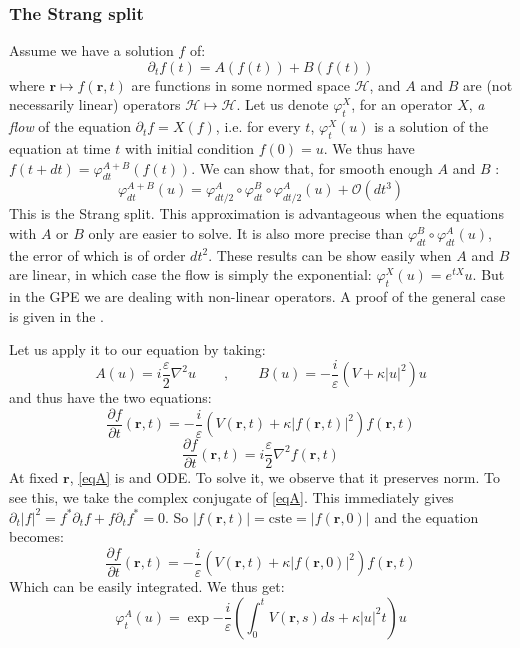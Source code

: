 \documentclass{article}
\begin{document}
\subsubsection*{The Strang split}
Assume we have a solution $f$ of:
$$
\partial_t f(t)= A(f(t))+B(f(t))
$$
where $\mathbf{r}\longmapsto f(\mathbf{r},t)$ are functions in some normed space $\mathcal{H}$, and $A$ and $B$ are (not necessarily linear) operators $\mathcal{H} \longmapsto \mathcal{H}$. Let us denote $\varphi^X_t$, for an operator $X$, \textit{a flow} of the equation $\partial_t f= X(f)$, i.e. for every $t$, $\varphi^X_t(u)$ is a solution of the equation at time $t$ with initial condition $f(0)=u$. We thus have $f(t+dt)=\varphi^{A+B}_{dt}(f(t))$. We can show that, for smooth enough $A$ and $B$ :
\begin{equation}\label{strangsplit}
    \varphi^{A+B}_{dt}(u)=\varphi^A_{dt/2}\circ\varphi^B_{dt}\circ\varphi^A_{dt/2}(u)+\mathcal{O}(dt^3)
\end{equation}
This is the Strang split. This approximation is advantageous when the equations with $A$ or $B$ only are easier to solve. It is also more precise than $\varphi^B_{dt}\circ\varphi^A_{dt}(u)$, the error of which is of order $dt^2$. These results can be show easily when $A$ and $B$ are linear, in which case the flow is simply the exponential: $\varphi^X_t(u)=e^{tX}u$. But in the GPE we are dealing with non-linear operators. A proof of the general case is given in the .

\bigskip
Let us apply it to our equation by taking:
$$A(u)=i\frac{\varepsilon}{2} \nabla^{2} u \qquad,\qquad B(u)=-\frac{i}{\varepsilon}\left(V +\kappa|u|^{2}\right) u$$
and thus have the two equations:
\begin{equation}\label{eqA}
    \frac{\partial f}{\partial t}(\mathbf{r},t)=-\frac{i}{\varepsilon}\left(V(\mathbf{r},t) +\kappa|f(\mathbf{r},t)|^{2}\right) f(\mathbf{r},t)
\end{equation}
\begin{equation}\label{eqB}
    \frac{\partial f}{\partial t}(\mathbf{r},t)=i\frac{\varepsilon}{2} \nabla^{2} f(\mathbf{r},t)
\end{equation}
At fixed $\mathbf{r}$, \eqref{eqA} is and ODE. To solve it, we observe that it preserves norm. To see this, we take the complex conjugate of \eqref{eqA}. This immediately gives $\partial_t|f|^2=f^*\partial_t f+f\partial_t f^*=0$. So $|f(\mathbf{r},t)|=\text{cste}=|f(\mathbf{r},0)|$ and the equation becomes:
$$
\frac{\partial f}{\partial t}(\mathbf{r},t)=-\frac{i}{\varepsilon}\left(V(\mathbf{r},t) +\kappa|f(\mathbf{r},0)|^{2}\right) f(\mathbf{r},t)
$$
Which can be easily integrated. We thus get:
\begin{equation}\label{eq:phiA}
    \varphi^A_t(u)=\exp{-\frac{i}{\varepsilon}\left(\int_0^t V(\mathbf{r},s)ds +\kappa|u|^{2}t\right)}u
\end{equation}
\end{document}
